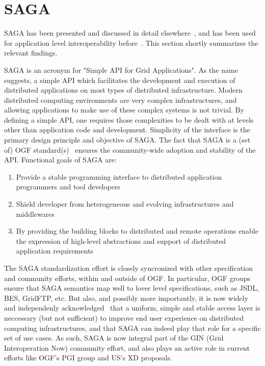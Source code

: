 \documentclass[10pt,conference,final,letterpaper,twoside,twocolumn,]{IEEEtran}
\begin{document}
\section{SAGA}
\label{sec:saga}

 SAGA has been presented and discussed in detail
 elsewhere~\cite{sagapub...}, and has been used for application level
 interoperability before~\cite{sagainterop...}.  This section shortly
 summarizes the relevant findings.

 SAGA is an acronym for "Simple API for Grid Applications". As the
 name suggests, a simple API which facilitates the development and
 execution of distributed applications on most types of distributed
 infrastructure.  Modern distributed computing environments are very
 complex infrastructures, and allowing applications to make use of
 these complex systems is not trivial.  By defining a simple API, one
 requires those complexities to be dealt with at levels other than
 application code and development.  Simplicity of the interface is the
 primary design principle and objective of SAGA.  The fact that SAGA
 is a (set of) OGF standard(s)~\cite{sagaspecs...} ensures the
 community-wide adoption and stability of the API.  Functional goals
 of SAGA are:

 \begin{enumerate}

  \item Provide a stable programming interface to distributed
  application programmers and tool developers
 
  \item Shield developer from heterogeneous and evolving
  infrastructures and middlewares

  \item By providing the building blocks to distributed and remote
  operations enable the expression of high-level abstractions and
  support of distributed application requirements

 \end{enumerate}

 The SAGA standardization effort is closely syncronized with other
 specification and community efforts, within and outside of OGF.  In
 particular, OGF groups ensure that SAGA semantics map well to lover
 level specifications, such as JSDL, BES, GridFTP, etc.   But also,
 and possibly more importantly, it is now widely and independenly
 acknowledged~\cite{refs?} that a uniform, simple and stable access
 layer is neccessary (but not sufficient) to improve end user
 experience on distributed computing infrastructures, and that SAGA
 can indeed play that role for a specific set of use cases.  As such,
 SAGA is now integral part of the GIN (Grid Interoperation Now)
 community effort, and also plays an active role in current efforts
 like OGF's PGI group and US's XD proposals.
  
\end{document}
